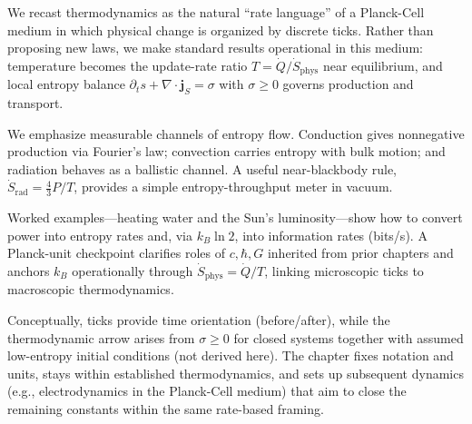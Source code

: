 We recast thermodynamics as the natural “rate language” of a Planck-Cell medium in which physical change is organized by discrete ticks. Rather than proposing new laws, we make standard results operational in this medium: temperature becomes the update-rate ratio \(T=\dot Q/\dot S_{\mathrm{phys}}\) near equilibrium, and local entropy balance \(\partial_t s+\nabla\!\cdot\!\mathbf j_S=\sigma\) with \(\sigma\ge0\) governs production and transport.

We emphasize measurable channels of entropy flow. Conduction gives nonnegative production via Fourier’s law; convection carries entropy with bulk motion; and radiation behaves as a ballistic channel. A useful near-blackbody rule, \(\dot S_{\mathrm{rad}}=\tfrac{4}{3}P/T\), provides a simple entropy-throughput meter in vacuum.

Worked examples—heating water and the Sun’s luminosity—show how to convert power into entropy rates and, via \(k_B\ln 2\), into information rates (bits/s). A Planck-unit checkpoint clarifies roles of \(c,\hbar,G\) inherited from prior chapters and anchors \(k_B\) operationally through \(\dot S_{\mathrm{phys}}=\dot Q/T\), linking microscopic ticks to macroscopic thermodynamics.

Conceptually, ticks provide time orientation (before/after), while the thermodynamic arrow arises from \(\sigma\ge0\) for closed systems together with assumed low-entropy initial conditions (not derived here). The chapter fixes notation and units, stays within established thermodynamics, and sets up subsequent dynamics (e.g., electrodynamics in the Planck-Cell medium) that aim to close the remaining constants within the same rate-based framing.
